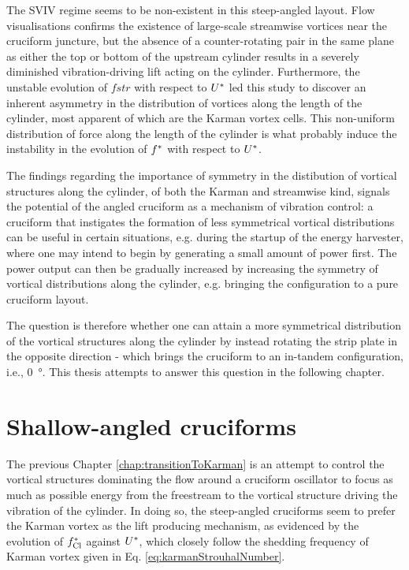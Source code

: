 \documentclass[oneside]{utmthesis}
\begin{document}
The SVIV regime seems to be non-existent in this steep-angled layout. Flow visualisations confirms the existence of large-scale streamwise vortices near the cruciform juncture, but the absence of a counter-rotating pair in the same plane as either the top or bottom of the upstream cylinder results in a severely diminished vibration-driving lift acting on the cylinder. Furthermore, the unstable evolution of $fstr$ with respect to $U^{*}$ led this study to discover an inherent asymmetry in the distribution of vortices along the length of the cylinder, most apparent of which are the Karman vortex cells. This non-uniform distribution of force along the length of the cylinder is what probably induce the instability in the evolution of $f^{*}$ with respect to $U^{*}$. 

The findings regarding the importance of symmetry in the distibution of vortical structures along the cylinder, of both the Karman and streamwise kind, signals the potential of the angled cruciform as a mechanism of vibration control: a cruciform that instigates the formation of less symmetrical vortical distributions can be useful in certain situations, e.g. during the startup of the energy harvester, where one may intend to begin by generating a small amount of power first. The power output can then be gradually increased by increasing the symmetry of vortical distributions along the cylinder, e.g. bringing the configuration to a pure cruciform layout.

The question is therefore whether one can attain a more symmetrical distribution of the vortical structures along the cylinder by instead rotating the strip plate in the opposite direction - which brings the cruciform to an in-tandem configuration, i.e., \SI{0}{\degree}. This thesis attempts to answer this question in the following chapter.

\chapter{Shallow-angled cruciforms}\label{chap:kvivRegime}
The previous Chapter \ref{chap:transitionToKarman} is an attempt to control the vortical structures dominating the flow around a cruciform oscillator to focus as much as possible energy from the freestream to the vortical structure driving the vibration of the cylinder. In doing so, the steep-angled cruciforms seem to prefer the Karman vortex as the lift producing mechanism, as evidenced by the evolution of $f_{\text{Cl}}^{*}$ against $U^{*}$, which closely follow the shedding frequency of Karman vortex given in Eq. \ref{eq:karmanStrouhalNumber}.
\end{document}

